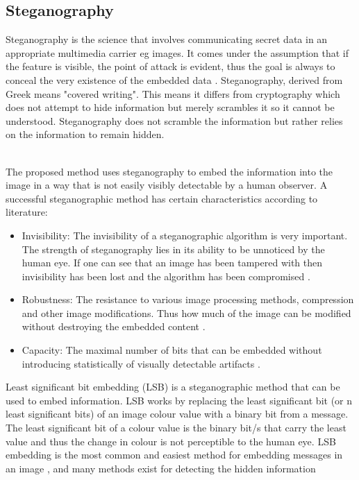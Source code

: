 \documentclass[12pt]{article}
\begin{document}
\subsection{Steganography}
\label{introSteganography}
Steganography is the science that involves communicating secret data in an appropriate multimedia carrier eg images. It comes under the assumption that if the feature is visible, the point of attack is evident, thus the goal is always to conceal the very existence of the embedded data \cite{cheddad2010digital}.
Steganography, derived from Greek means "covered writing".
This means it differs from cryptography which does not attempt to hide information but merely scrambles it so it cannot be understood.
Steganography does not scramble the information but rather relies on the information to remain hidden.

\hspace{0pt} \\
The proposed method uses steganography to embed the information into the image in a way that is not easily visibly detectable by a human observer.
A successful steganographic method has certain characteristics according to literature:
\begin{itemize}
	\item Invisibility: The invisibility of a steganographic algorithm is very important. The strength of steganography lies in its ability to be unnoticed by the human eye. If one can see that an image has been tampered with then invisibility has been lost and the algorithm has been compromised \cite{morkel2005overview}.
	\item Robustness: The resistance to various image processing methods, compression and other image modifications. Thus how much of the image can be modified without destroying the embedded content \cite{cheddad2010digital}.
	\item Capacity: The maximal number of bits that can be embedded without introducing statistically of visually detectable artifacts \cite{fridrich2009steganography}.
\end{itemize}
Least significant bit embedding (LSB) is a steganographic method that can be used to embed information. 
LSB works by replacing the least significant bit (or n least significant bits) of an image colour value with a binary bit from a message. The least significant bit of a colour value is the binary bit/s that carry the least value and thus the change in colour is not perceptible to the human eye.
LSB embedding is the most common and easiest method for embedding messages in an image \cite{lee2000high}, and many methods exist for detecting the hidden information 
\end{document}
